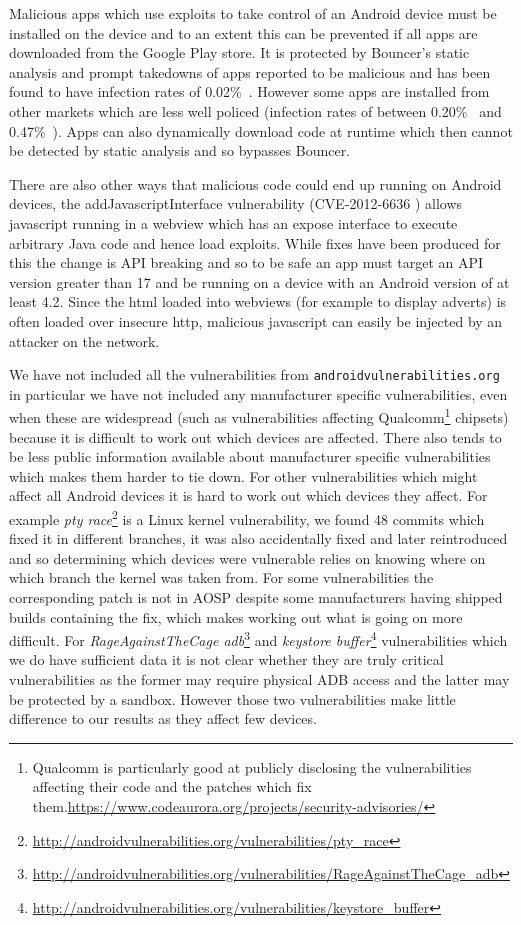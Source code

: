 \documentclass[conference,a4paper,twoside]{IEEEtran}
\newcommand{\avo}{\texttt{androidvulnerabilities.org}}
\begin{document}
Malicious apps which use exploits to take control of an Android device must be installed on the device and to an extent this can be prevented if all apps are downloaded from the Google Play store.
It is protected by Bouncer's static analysis and prompt takedowns of apps reported to be malicious and has been found to have infection rates of 0.02\%~\cite{Zhou2012a}.
However some apps are installed from other markets which are less well policed (infection rates of between 0.20\%~ and 0.47\%~\cite{Zhou2012a}).
Apps can also dynamically download code at runtime which then cannot be detected by static analysis and so bypasses Bouncer.

There are also other ways that malicious code could end up running on Android devices, the addJavascriptInterface vulnerability (CVE-2012-6636 ) allows javascript running in a webview which has an expose interface to execute arbitrary Java code and hence load exploits.
While fixes have been produced for this the change is API breaking and so to be safe an app must target an API version greater than 17 and be running on a device with an Android version of at least 4.2.
Since the html loaded into webviews (for example to display adverts) is often loaded over insecure http, malicious javascript can easily be injected by an attacker on the network.

We have not included all the vulnerabilities from \avo\, in particular we have not included any manufacturer specific vulnerabilities, even when these are widespread (such as vulnerabilities affecting Qualcomm\footnote{Qualcomm is particularly good at publicly disclosing the vulnerabilities affecting their code and the patches which fix them.\url{https://www.codeaurora.org/projects/security-advisories/}} chipsets) because it is difficult to work out which devices are affected.
There also tends to be less public information available about manufacturer specific vulnerabilities which makes them harder to tie down.
For other vulnerabilities which might affect all Android devices it is hard to work out which devices they affect.
For example \emph{pty race}\footnote{\url{http://androidvulnerabilities.org/vulnerabilities/pty_race}} is a Linux kernel vulnerability, we found 48 commits which fixed it in different branches, it was also accidentally fixed and later reintroduced and so determining which devices were vulnerable relies on knowing where on which branch the kernel was taken from.
For some vulnerabilities the corresponding patch is not in AOSP despite some manufacturers having shipped builds containing the fix, which makes working out what is going on more difficult.
For \emph{RageAgainstTheCage adb}\footnote{\url{http://androidvulnerabilities.org/vulnerabilities/RageAgainstTheCage_adb}} and \emph{keystore buffer}\footnote{\url{http://androidvulnerabilities.org/vulnerabilities/keystore_buffer}} vulnerabilities which we do have sufficient data it is not clear whether they are truly critical vulnerabilities as the former may require physical ADB access and the latter may be protected by a sandbox.
However those two vulnerabilities make little difference to our results as they affect few devices.
\end{document}
